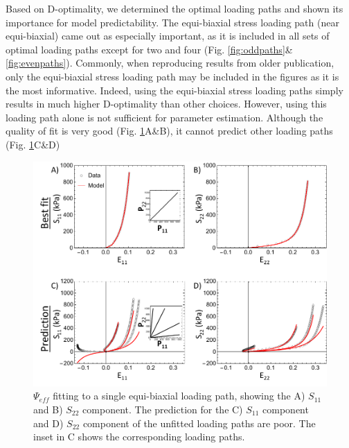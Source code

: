     Based on D-optimality, we determined the optimal loading paths and shown its importance for model predictability. The equi-biaxial stress loading path (near equi-biaxial) came out as especially important, as it is included in all sets of optimal loading paths except for two and four (Fig. \ref{fig:oddpaths}\&\ref{fig:evenpaths}). Commonly, when reproducing results from older publication, only the equi-biaxial stress loading path may be included in the figures as it is the most informative. Indeed, using the equi-biaxial stress loading paths simply results in much higher D-optimality than other choices. However, using this loading path alone is not sufficient for parameter estimation. Although the quality of fit is very good (Fig. \ref{fig:effequifit}A\&B), it cannot predict other loading paths (Fig. \ref{fig:effequifit}C\&D) 
    
\begin{figure}[!hbtp]
\centering
\includegraphics[width=\textwidth]{Images/chapter5/effequifit}
\caption{$\Psi_{eff}$ fitting to a single equi-biaxial loading path, showing the A) $S_{11}$ and B) $S_{22}$ component. The prediction for the C) $S_{11}$ component and D) $S_{22}$ component of the unfitted loading paths are poor. The inset in C shows the corresponding loading paths.}
\label{fig:effequifit}
\end{figure} 


